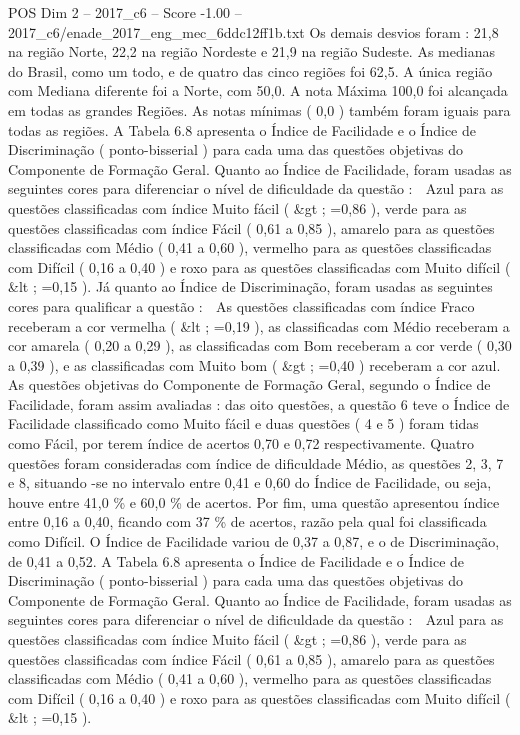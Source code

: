 \begin{textsample}{POS Dim 2 – 2017\_c6 – Score -1.00 – 2017\_c6/enade\_2017\_eng\_mec\_6ddc12ff1b.txt}
Os demais desvios foram : 21,8 na região Norte, 22,2 na região Nordeste e 21,9 na região Sudeste.
As medianas do Brasil, como um todo, e de quatro das cinco regiões foi 62,5.
A única região com Mediana diferente foi a Norte, com 50,0.
A nota Máxima 100,0 foi alcançada em todas as grandes Regiões.
As notas mínimas ( 0,0 ) também foram iguais para todas as regiões.
A Tabela 6.8 apresenta o Índice de Facilidade e o Índice de Discriminação ( ponto-bisserial ) para cada uma das questões objetivas do Componente de Formação Geral.
Quanto ao Índice de Facilidade, foram usadas as seguintes cores para diferenciar o nível de dificuldade da questão :  Azul para as questões classificadas com índice Muito fácil ( \&gt ; =0,86 ), verde para as questões classificadas com índice Fácil ( 0,61 a 0,85 ), amarelo para as questões classificadas com Médio ( 0,41 a 0,60 ), vermelho para as questões classificadas com Difícil ( 0,16 a 0,40 ) e roxo para as questões classificadas com Muito difícil ( \&lt ; =0,15 ).
Já quanto ao Índice de Discriminação, foram usadas as seguintes cores para qualificar a questão :  As questões classificadas com índice Fraco receberam a cor vermelha ( \&lt ; =0,19 ), as classificadas com Médio receberam a cor amarela ( 0,20 a 0,29 ), as classificadas com Bom receberam a cor verde ( 0,30 a 0,39 ), e as classificadas com Muito bom ( \&gt ; =0,40 ) receberam a cor azul.
As questões objetivas do Componente de Formação Geral, segundo o Índice de Facilidade, foram assim avaliadas : das oito questões, a questão 6 teve o Índice de Facilidade classificado como Muito fácil e duas questões ( 4 e 5 ) foram tidas como Fácil, por terem índice de acertos 0,70 e 0,72 respectivamente.
Quatro questões foram consideradas com índice de dificuldade Médio, as questões 2, 3, 7 e 8, situando -se no intervalo entre 0,41 e 0,60 do Índice de Facilidade, ou seja, houve entre 41,0 \% e 60,0 \% de acertos.
Por fim, uma questão apresentou índice entre 0,16 a 0,40, ficando com 37 \% de acertos, razão pela qual foi classificada como Difícil.
O Índice de Facilidade variou de 0,37 a 0,87, e o de Discriminação, de 0,41 a 0,52.
A Tabela 6.8 apresenta o Índice de Facilidade e o Índice de Discriminação ( ponto-bisserial ) para cada uma das questões objetivas do Componente de Formação Geral.
Quanto ao Índice de Facilidade, foram usadas as seguintes cores para diferenciar o nível de dificuldade da questão :  Azul para as questões classificadas com índice Muito fácil ( \&gt ; =0,86 ), verde para as questões classificadas com índice Fácil ( 0,61 a 0,85 ), amarelo para as questões classificadas com Médio ( 0,41 a 0,60 ), vermelho para as questões classificadas com Difícil ( 0,16 a 0,40 ) e roxo para as questões classificadas com Muito difícil ( \&lt ; =0,15 ).

\end{textsample}
